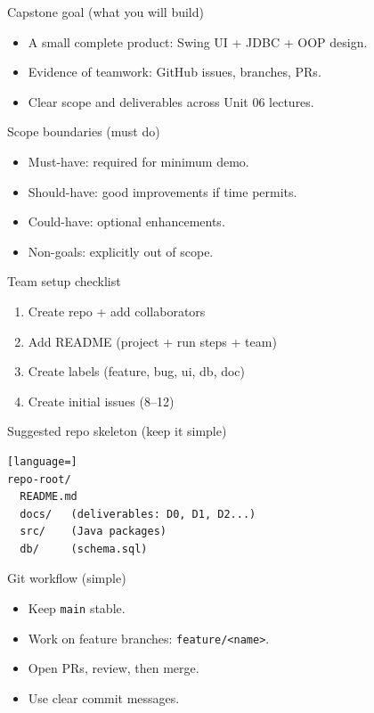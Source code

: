 \documentclass{beamer}
\begin{document}
\begin{frame}{Capstone goal (what you will build)}
  \begin{itemize}[<+->]
    \item A small complete product: Swing UI + JDBC + OOP design.
    \item Evidence of teamwork: GitHub issues, branches, PRs.
    \item Clear scope and deliverables across Unit 06 lectures.
  \end{itemize}
  \slidesources{\OOPSUnitVISources}
\end{frame}

\begin{frame}{Scope boundaries (must do)}
  \begin{itemize}[<+->]
    \item Must-have: required for minimum demo.
    \item Should-have: good improvements if time permits.
    \item Could-have: optional enhancements.
    \item Non-goals: explicitly out of scope.
  \end{itemize}
  \slidesources{\OOPSUnitVISources}
\end{frame}

\begin{frame}{Team setup checklist}
  \begin{enumerate}[<+->]
    \item Create repo + add collaborators
    \item Add README (project + run steps + team)
    \item Create labels (feature, bug, ui, db, doc)
    \item Create initial issues (8--12)
  \end{enumerate}
  \slidesources{\OOPSUnitVISources}
\end{frame}

\begin{frame}[fragile]{Suggested repo skeleton (keep it simple)}
\begin{lstlisting}[language=]
repo-root/
  README.md
  docs/   (deliverables: D0, D1, D2...)
  src/    (Java packages)
  db/     (schema.sql)
\end{lstlisting}
  \slidesources{\OOPSUnitVISources}
\end{frame}

\begin{frame}{Git workflow (simple)}
  \begin{itemize}[<+->]
    \item Keep \texttt{main} stable.
    \item Work on feature branches: \texttt{feature/<name>}.
    \item Open PRs, review, then merge.
    \item Use clear commit messages.
  \end{itemize}
  \slidesources{\OOPSUnitVISources}
\end{frame}
\end{document}
